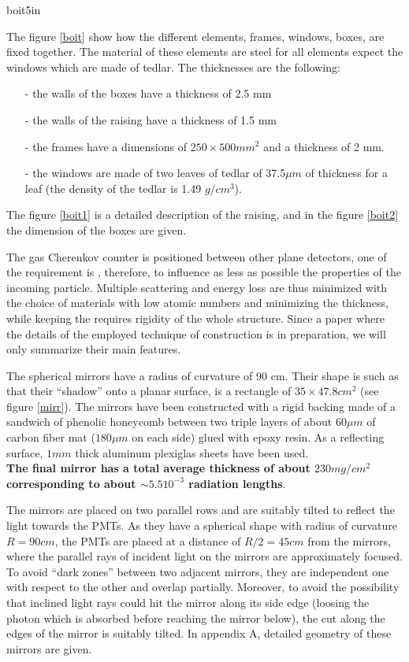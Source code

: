 \documentclass[12pt]{article}
\begin{document}
 {boit}{5in}
              
   The figure \ref{boit} show how the different elements, 
frames, windows, boxes,  
 are fixed together. The material of these elements are steel for all
 elements expect the windows which are made of tedlar. The thicknesses are
 the following:
\begin{itemize}
\item[-] the walls of the boxes have a thickness of 2.5 mm
\item[-] the walls of the raising have a thickness of 1.5 mm
\item[-] the frames have a dimensions of $250 \times 500 mm^2$ and a thickness
of 2 mm.
\item[-] the windows are made of two leaves of tedlar of 37.5$\mu m$ of
thickness for a leaf (the density of the tedlar is 1.49 $g/cm^3$).
\end{itemize}

The figure \ref{boit1} is a detailed description of the raising, 
and in the figure \ref{boit2} the dimension of the boxes are given.

The gas Cherenkov counter is positioned between other plane detectors, one
of the requirement is , therefore, to influence as less as possible the 
properties of the incoming particle. Multiple scattering and energy loss are 
thus minimized with the choice of materials with low atomic numbers and
minimizing the thickness, while keeping the requires rigidity of the 
whole structure. Since a paper where the details of the employed technique of
construction is in preparation, we will only summarize their main features.

The spherical mirrors have a radius of curvature of 90 cm. Their shape is 
such as that their ``shadow'' onto a planar surface, is a rectangle
of $35 \times 47.8 cm^2$ (see figure \ref{mirr}).
 The mirrors have been constructed with a rigid
backing made of a sandwich of phenolic honeycomb between two triple layers
of about $60 \mu m$ of carbon fiber mat ($180 \mu m$ on each side) glued with
epoxy resin. As a reflecting surface, $ 1mm$ thick aluminum plexiglas sheets 
have been used. \\
{\bf The final mirror has a total average thickness of about $230 mg/cm^2$ 
corresponding to about $\sim 5.5 10^{-3}$ radiation lengths}.

The mirrors are placed on two parallel rows and are suitably tilted to 
reflect the light towards the PMTs. As they have a spherical shape with radius 
of curvature $R=90 cm$, the PMTs are placed at a distance of $R/2=45 cm$ from
the mirrors, where the parallel rays of incident light on the mirrors are
approximately focused. To avoid ``dark zones'' between two adjacent mirrors,
they are independent one with respect to the other and overlap partially. 
Moreover, to avoid the possibility that inclined light rays could hit the mirror
along its side edge (loosing the photon which is absorbed before reaching the
mirror below), the cut along the edges of the mirror is suitably tilted. In
appendix A, detailed geometry of these mirrors are given.
\end{document}
